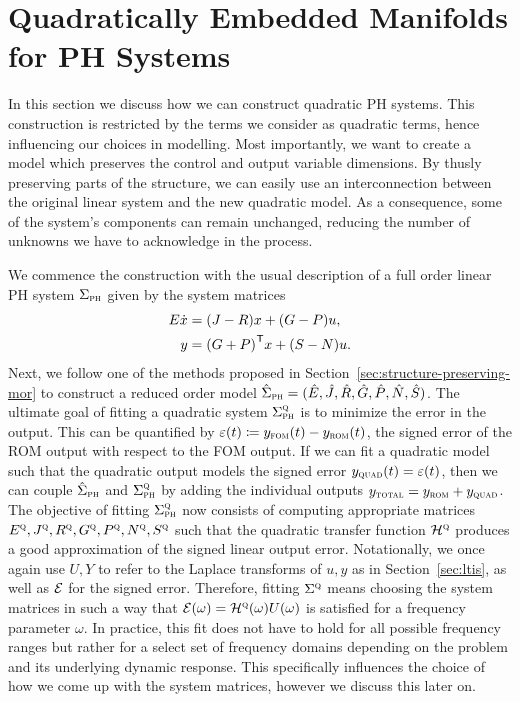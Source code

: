 \section{Quadratically Embedded Manifolds for \acl{PH} Systems}\label{sec:quadratically-embedded-manifolds-ph-systems}

In this section we discuss how we can construct quadratic \ac{PH} systems.
This construction is restricted by the terms we consider as quadratic terms, hence influencing our choices in modelling.
Most importantly, we want to create a model which preserves the control and output variable dimensions.
By thusly preserving parts of the structure, we can easily use an interconnection between the original linear system and the new quadratic model.
As a consequence, some of the system's components can remain unchanged, reducing the number of unknowns we have to acknowledge in the process.

We commence the construction with the usual description of a full order linear \ac{PH} system $\Sigma_{\textnormal{\scshape ph}}$ given by the system matrices
\begin{equation*}
    \begin{aligned}
        E \dot{x} &= (J - R) x + (G - P) u, \\
        y &= {(G + P)}^{\mkern1mu \mathsf{T}} x + (S - N) u.
    \end{aligned}
\end{equation*}
Next, we follow one of the methods proposed in Section~\ref{sec:structure-preserving-mor} to construct a reduced order model $\hat{\Sigma}_{\textnormal{\scshape ph}} = (\hat{E}, \hat{J}, \hat{R}, \hat{G}, \hat{P}, \hat{N}, \hat{S})$.
The ultimate goal of fitting a quadratic system $\Sigma_{\textnormal{\scshape ph}}^{\textnormal{\scshape q}}$ is to minimize the error in the output.
This can be quantified by $\varepsilon(t) \coloneqq y_{\textnormal{\scshape fom}}(t) - y_{\textnormal{\scshape rom}}(t)$, the signed error of the \ac{ROM} output with respect to the \ac{FOM} output.
If we can fit a quadratic model such that the quadratic output models the signed error $y_{\textnormal{\scshape quad}}(t) = \varepsilon(t)$, then we can couple $\hat{\Sigma}_{\textnormal{\scshape ph}}$ and $\Sigma_{\textnormal{\scshape ph}}^{\textnormal{\scshape q}}$ by adding the individual outputs $y_{\textnormal{\scshape total}} = y_{\textnormal{\scshape rom}} + y_{\textnormal{\scshape quad}}$.
The objective of fitting $\Sigma_{\textnormal{\scshape ph}}^{\textnormal{\scshape q}}$ now consists of computing appropriate matrices $E^{\textnormal{\scshape q}}, J^{\textnormal{\scshape q}}, R^{\textnormal{\scshape q}}, G^{\textnormal{\scshape q}}, P^{\textnormal{\scshape q}}, N^{\textnormal{\scshape q}}, S^{\textnormal{\scshape q}}$ such that the quadratic transfer function $\mathcal{H}^{\textnormal{\scshape q}}$ produces a good approximation of the signed linear output error.
Notationally, we once again use $U, Y$ to refer to the Laplace transforms of $u, y$ as in Section~\ref{sec:ltis}, as well as $\mathcal{E}$ for the signed error.
Therefore, fitting $\Sigma^{\textnormal{\scshape q}}$ means choosing the system matrices in such a way that $\mathcal{E}(\omega) = \mathcal{H}^{\textnormal{\scshape q}}(\omega) U(\omega)$ is satisfied for a frequency parameter $\omega$.
In practice, this fit does not have to hold for all possible frequency ranges but rather for a select set of frequency domains depending on the problem and its underlying dynamic response.
This specifically influences the choice of how we come up with the system matrices, however we discuss this later on.

